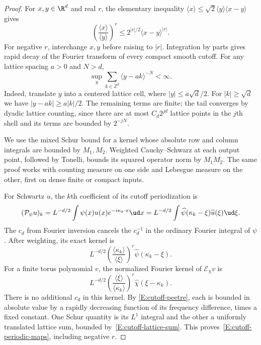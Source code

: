 \begin{proof}
  For $x,y \in \R^d$ and real $r$, the elementary inequality
  $\langle x\rangle\le\sqrt{2}\langle y\rangle\langle x-y\rangle$ gives
  \begin{equation}\label{E:cutoff-peetre}
    \left(\frac{\langle x\rangle}{\langle y\rangle}\right)^r
    \le 2^{|r|/2}\langle x-y\rangle^{|r|}.
  \end{equation}
  For negative $r$, interchange $x,y$ before raising to $|r|$. Integration
  by parts gives rapid decay of the Fourier transform of every compact
  smooth cutoff. For any lattice spacing $a > 0$ and $N > d$,
  \begin{equation}\label{E:cutoff-lattice-sum}
    \sup_y\sum_{k\in\mathbb Z^d}\langle y-ak\rangle^{-N}<\infty.
  \end{equation}
  Indeed, translate $y$ into a centered lattice cell, where
  $|y|\le a\sqrt d/2$. For $|k|\ge\sqrt d$ we have
  $|y-ak|\ge a|k|/2$. The remaining terms are finite; the tail converges
  by dyadic lattice counting, since there are at most $C_d2^{jd}$ lattice
  points in the $j$th shell and its terms are bounded by $2^{-jN}$.

  We use the mixed Schur bound for a kernel whose absolute row and column
  integrals are bounded by $M_1,M_2$. Weighted Cauchy--Schwarz at each
  output point, followed by Tonelli, bounds its squared operator norm by
  $M_1M_2$. The same proof works with counting measure on one side and
  Lebesgue measure on the other, first on dense finite or compact inputs.

  For Schwartz $u$, the $k$th coefficient of its cutoff periodization is
  \[
    (\mathcal P_\psi u)_k
    = L^{-d/2}\int\psi(x)u(x)e^{-i\kappa_k\cdot x}\ud x
    = L^{-d/2}\int\widehat\psi(\kappa_k-\xi)\widehat u(\xi)\ud\xi.
  \]
  The $c_d$ from Fourier inversion cancels the $c_d^{-1}$ in the ordinary
  Fourier integral of $\psi$. After weighting, its exact kernel is
  \[
    L^{-d/2}\left(\frac{\langle\kappa_k\rangle}{\langle\xi\rangle}\right)^r
    \widehat\psi(\kappa_k-\xi).
  \]
  For a finite torus polynomial $v$, the normalized Fourier kernel of
  $\mathcal E_\chi v$ is
  \[
    L^{-d/2}\left(\frac{\langle\xi\rangle}{\langle\kappa_k\rangle}\right)^r
    \widehat\chi(\xi-\kappa_k).
  \]
  There is no additional $c_d$ in this kernel. By
  \eqref{E:cutoff-peetre}, each is bounded in absolute value by a rapidly
  decreasing function of its frequency difference, times a fixed constant.
  One Schur quantity is its $L^1$ integral and the other a uniformly
  translated lattice sum, bounded by~\eqref{E:cutoff-lattice-sum}.
  This proves~\eqref{E:cutoff-periodic-maps}, including negative $r$.


\end{proof}
